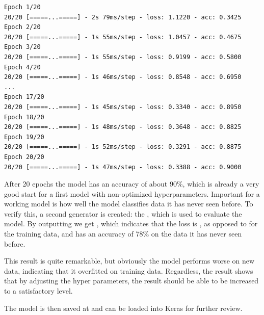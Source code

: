 \begin{lstlisting}
Epoch 1/20
20/20 [=====...=====] - 2s 79ms/step - loss: 1.1220 - acc: 0.3425
Epoch 2/20
20/20 [=====...=====] - 1s 55ms/step - loss: 1.0457 - acc: 0.4675
Epoch 3/20
20/20 [=====...=====] - 1s 55ms/step - loss: 0.9199 - acc: 0.5800
Epoch 4/20
20/20 [=====...=====] - 1s 46ms/step - loss: 0.8548 - acc: 0.6950
...
Epoch 17/20
20/20 [=====...=====] - 1s 45ms/step - loss: 0.3340 - acc: 0.8950
Epoch 18/20
20/20 [=====...=====] - 1s 48ms/step - loss: 0.3648 - acc: 0.8825
Epoch 19/20
20/20 [=====...=====] - 1s 52ms/step - loss: 0.3291 - acc: 0.8875
Epoch 20/20
20/20 [=====...=====] - 1s 47ms/step - loss: 0.3388 - acc: 0.9000
\end{lstlisting}

After 20 epochs the model has an accuracy of about 90\%, which is already a very good start for a first model with non-optimized hyperparameters.
Important for a working model is how well the model classifies data it has never seen before.
To verify this, a second generator is created: the , which is used to evaluate the model.
By outputting  we get \code{[0.6071663084129493, 0.7866667]}, which indicates that the loss is , as opposed to  for the training data, and has an accuracy of 78\% on the data it has never seen before.

This result is quite remarkable, but obviously the model performs worse on new data, indicating that it overfitted on training data.
Regardless, the result shows that by adjusting the hyper parameters, the result should be able to be increased to a satisfactory level.

The model is then saved at  and can be loaded into Keras for further review.